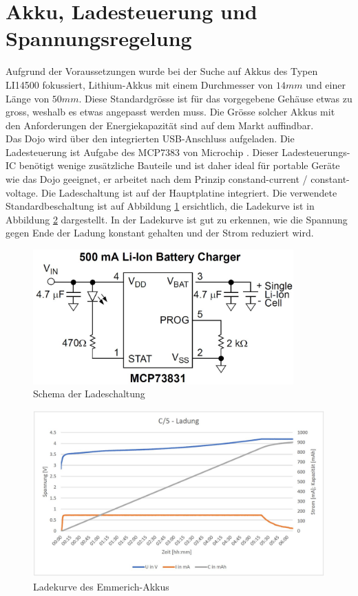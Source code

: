  
\section{Akku, Ladesteuerung und Spannungsregelung}

Aufgrund der Voraussetzungen wurde bei der Suche auf Akkus des Typen LI14500 fokussiert, Lithium-Akkus mit einem Durchmesser von $14mm$ und einer Länge von $50mm$. Diese Standardgrösse ist für das vorgegebene Gehäuse etwas zu gross, weshalb es etwas angepasst werden muss. Die Grösse solcher Akkus mit den Anforderungen der Energiekapazität sind auf dem Markt auffindbar.\\

Das Dojo wird über den integrierten USB-Anschluss aufgeladen. Die Ladesteuerung ist Aufgabe des MCP7383 von Microchip . Dieser Ladesteuerungs-IC benötigt wenige zusätzliche Bauteile und ist daher ideal für portable Geräte wie das Dojo geeignet, er arbeitet nach dem Prinzip constand-current / constant-voltage. Die Ladeschaltung ist auf der Hauptplatine integriert. Die verwendete Standardbeschaltung ist auf Abbildung \ref{fig:Ladeschaltung} ersichtlich, die Ladekurve ist in Abbildung \ref{fig:Ladekurve} dargestellt. In der Ladekurve ist gut zu erkennen, wie die Spannung gegen Ende der Ladung konstant gehalten und der Strom reduziert wird.\\

\begin{figure}[htp]
	\centering
	\includegraphics[width=10cm]{Bilder/LadeschaltungSchema.JPG}
	 \caption{Schema der Ladeschaltung}
	 \label{fig:Ladeschaltung}
\end{figure}

\begin{figure}[htp]
	\centering
	\includegraphics[width=15cm]{Bilder/Ladekurve.JPG}
	 \caption{Ladekurve des Emmerich-Akkus}
	 \label{fig:Ladekurve}
\end{figure}

